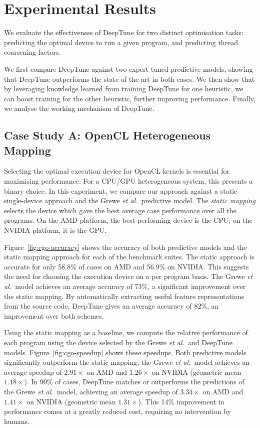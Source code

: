 \section{Experimental Results} \label{sec:results}

We evaluate the effectiveness of DeepTune for two distinct optimisation tasks: predicting the optimal device to run a given program, and predicting thread coarsening factors.

We first compare DeepTune against two expert-tuned predictive models, showing that DeepTune outperforms the state-of-the-art in both cases. We then show that by leveraging knowledge learned from training DeepTune for one heuristic, we can boost training for the other heuristic, further improving performance. Finally, we analyse the working mechanism of DeepTune.


\subsection{Case Study A: OpenCL Heterogeneous Mapping}

Selecting the optimal execution device for OpenCL kernels is essential for maximising performance. For a CPU/GPU heterogeneous system, this presents a binary choice. In this experiment, we compare our approach against a static single-device approach and the Grewe \emph{et al.\ }predictive model. The \emph{static mapping} selects the device which gave the best average case performance over all the programs. On the AMD platform, the best-performing device is the CPU; on the NVIDIA platform, it is the GPU.

Figure~\ref{fig:cgo-accuracy} shows the accuracy of both predictive models and the static mapping approach for each of the benchmark suites. The static approach is accurate for only 58.8\% of cases on AMD and 56.9\% on NVIDIA. This suggests the need for choosing the execution device on a per program basis. The Grewe \emph{et al.\ }model achieves an average accuracy of 73\%, a significant improvement over the static mapping. By automatically extracting useful feature representations from the source code, DeepTune gives an average accuracy of 82\%, an improvement over both schemes.

Using the static mapping as a baseline, we compute the relative performance of each program using the device selected by the Grewe \emph{et al.\ }and DeepTune models. Figure~\ref{fig:cgo-speedup} shows these speedups. Both predictive models significantly outperform the static mapping; the Grewe \emph{et al.\ }model achieves an average speedup of $2.91\times$ on AMD and $1.26\times$ on NVIDIA (geometric mean $1.18\times$). In 90\% of cases, DeepTune matches or outperforms the predictions of the Grewe \emph{et al.\ }model, achieving an average speedup of $3.34\times$ on AMD and $1.41\times$ on NVIDIA (geometric mean $1.31\times$). This 14\% improvement in performance comes at a greatly reduced cost, requiring no intervention by humans.

